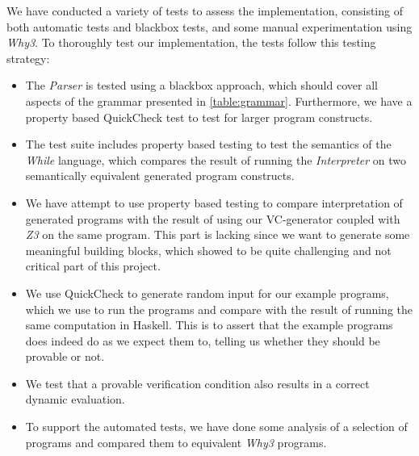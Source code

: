 
We have conducted a variety of tests to assess the implementation, consisting of both automatic tests and blackbox tests, and some manual experimentation using \textit{Why3}.
To thoroughly test our implementation, the tests follow this testing strategy:
\begin{itemize}
	\item The \textit{Parser} is tested using a blackbox approach, which should cover all aspects of the grammar presented in \cref{table:grammar}.
  Furthermore, we have a property based QuickCheck test to test for larger program constructs.
	\item The test suite includes property based testing to test the semantics of the \textit{While} language, which compares the result of running the \textit{Interpreter} on two semantically equivalent generated program constructs.
	\item We have attempt to use property based testing to compare interpretation of generated programs with the result of using our VC-generator coupled with \textit{Z3} on the same program. This part is lacking since we want to generate some meaningful building blocks, which showed to be quite challenging and not critical part of this project.
  \item We use QuickCheck to generate random input for our example programs, which we use to run the programs and compare with the result of running the same computation in Haskell. This is to assert that the example programs does indeed do as we expect them to, telling us whether they should be provable or not.
	\item We test that a provable verification condition also results in a correct dynamic evaluation.
  \item To support the automated tests, we have done some analysis of a selection of programs and compared them to equivalent \textit{Why3} programs.
\end{itemize}


